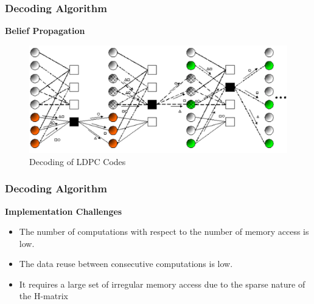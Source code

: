 \documentclass{beamer}
\begin{document}
\begin{frame}
  \frametitle{Decoding Algorithm}
  \textbf{Belief Propagation}
  
  \begin{figure}[h]
\begin{centering}
\includegraphics[scale=0.45]{img/decoding.png}
\caption[width=.3\textwidth]{Decoding of LDPC Codes}
\end{centering}
\end{figure}
  
\end{frame}

\begin{frame}
  \frametitle{Decoding Algorithm}
  \textbf{Implementation Challenges}
  
  \begin{itemize}
    \item The number of computations with respect to the number of memory access is low.
	\item The data reuse between consecutive computations is low.
	\item It requires a large set of irregular memory access due to the sparse nature of the H-matrix
  \end{itemize}
\end{frame}

\end{document}
